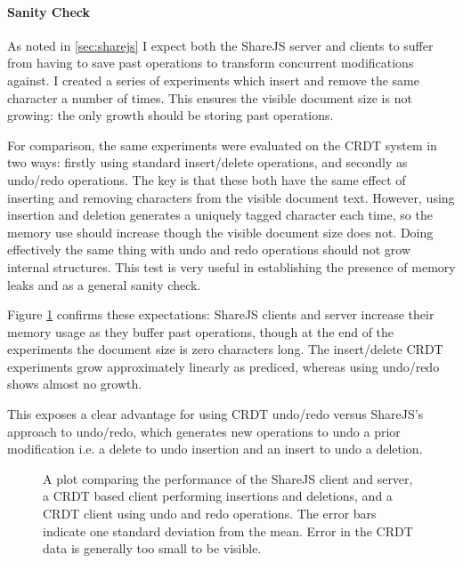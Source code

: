 \documentclass[12pt,a4paper,twoside,openright]{report}
\begin{document}
			\paragraph{Sanity Check}
				As noted in \cref{sec:sharejs} I expect both the ShareJS server and clients to suffer from having to save past operations to transform concurrent modifications against. I created a series of experiments which insert and remove the same character a number of times. This ensures the visible document size is not growing: the only growth should be storing past operations. 
				
				For comparison, the same experiments were evaluated on the CRDT system in two ways: firstly using standard insert/delete operations, and secondly as undo/redo operations. The key is that these both have the same effect of inserting and removing characters from the visible document text. However, using insertion and deletion generates a uniquely tagged character each time, so the memory use should increase though the visible document size does not. Doing effectively the same thing with undo and redo operations should not grow internal structures. This test is very useful in establishing the presence of memory leaks and as a general sanity check.
				
				Figure \ref{fig:sanitycheck} confirms these expectations: ShareJS clients and server increase their memory usage as they buffer past operations, though at the end of the experiments the document size is zero characters long. The insert/delete CRDT experiments grow approximately linearly as prediced, whereas using undo/redo shows almost no growth. 
				
				This exposes a clear advantage for using CRDT undo/redo versus ShareJS's approach to undo/redo, which generates new operations to undo a prior modification i.e. a delete to undo insertion and an insert to undo a deletion. 
				
				\begin{figure}[htb]
					\centering
					
					\caption[Memory Consumption Sanity Check] {A plot comparing the performance of the ShareJS client and server, a CRDT based client performing insertions and deletions, and a CRDT client using undo and redo operations. The error bars indicate one standard deviation from the mean. Error in the CRDT data is generally too small to be visible.}
					\label{fig:sanitycheck}
				\end{figure}
		
\end{document}
